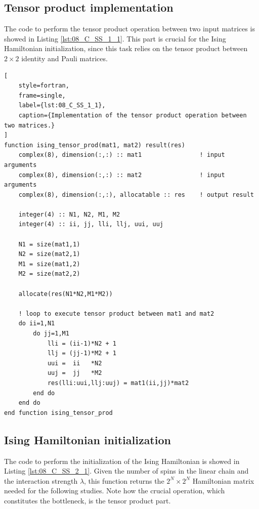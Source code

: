 \documentclass[pra, onecolumn, notitlepage, floats, 11pt]{revtex4-1}
\begin{document}
\subsection{Tensor product implementation}
The code to perform the tensor product operation between two input matrices is showed in Listing \ref{lst:08_C_SS_1_1}. This part is crucial for the Ising Hamiltonian initialization, since this task relies on the tensor product between \( 2 \times 2 \) identity and Pauli matrices.

\begin{lstlisting}[
    style=fortran,
    frame=single,
    label={lst:08_C_SS_1_1},
    caption={Implementation of the tensor product operation between two matrices.}
]
function ising_tensor_prod(mat1, mat2) result(res)
    complex(8), dimension(:,:) :: mat1                ! input  arguments
    complex(8), dimension(:,:) :: mat2                ! input  arguments
    complex(8), dimension(:,:), allocatable :: res    ! output result

    integer(4) :: N1, N2, M1, M2
    integer(4) :: ii, jj, lli, llj, uui, uuj

    N1 = size(mat1,1)
    N2 = size(mat2,1)
    M1 = size(mat1,2)
    M2 = size(mat2,2)

    allocate(res(N1*N2,M1*M2))

    ! loop to execute tensor product between mat1 and mat2
    do ii=1,N1
        do jj=1,M1
            lli = (ii-1)*N2 + 1
            llj = (jj-1)*M2 + 1
            uui =  ii   *N2
            uuj =  jj   *M2
            res(lli:uui,llj:uuj) = mat1(ii,jj)*mat2
        end do
    end do
end function ising_tensor_prod
\end{lstlisting}



\subsection{Ising Hamiltonian initialization}
The code to perform the initialization of the Ising Hamiltonian is showed in Listing \ref{lst:08_C_SS_2_1}. Given the number of spins in the linear chain and the interaction strength \( \lambda \), this function returns the \( 2^{N} \times 2^{N} \) Hamiltonian matrix needed for the following studies. Note how the crucial operation, which constitutes the bottleneck, is the tensor product part.
\end{document}
